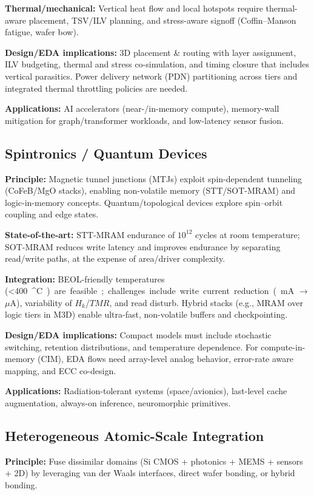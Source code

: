 \documentclass[conference]{IEEEtran}
\begin{document}
\textbf{Thermal/mechanical:}
Vertical heat flow and local hotspots require thermal-aware placement, TSV/ILV planning, and stress-aware signoff (Coffin--Manson fatigue, wafer bow).

\textbf{Design/EDA implications:}
3D placement \& routing with layer assignment, ILV budgeting, thermal and stress co-simulation, and timing closure that includes vertical parasitics.
Power delivery network (PDN) partitioning across tiers and integrated thermal throttling policies are needed.

\textbf{Applications:}
AI accelerators (near-/in-memory compute), memory-wall mitigation for graph/transformer workloads, and low-latency sensor fusion.

\subsection{Spintronics / Quantum Devices}
\textbf{Principle:}
Magnetic tunnel junctions (MTJs) exploit spin-dependent tunneling (CoFeB/MgO stacks), enabling non-volatile memory (STT/SOT-MRAM) and logic-in-memory concepts.
Quantum/topological devices explore spin--orbit coupling and edge states.

\textbf{State-of-the-art:}
STT-MRAM endurance of $10^{12}$ cycles at room temperature; SOT-MRAM reduces write latency and improves endurance by separating read/write paths, at the expense of area/driver complexity.

\textbf{Integration:}
BEOL-friendly temperatures (\SI{<400}{^\circ C}) are feasible; challenges include write current reduction (mA $\rightarrow$ $\mu$A), variability of $H_k$/$TMR$, and read disturb.
Hybrid stacks (e.g., MRAM over logic tiers in M3D) enable ultra-fast, non-volatile buffers and checkpointing.

\textbf{Design/EDA implications:}
Compact models must include stochastic switching, retention distributions, and temperature dependence.
For compute-in-memory (CIM), EDA flows need array-level analog behavior, error-rate aware mapping, and ECC co-design.

\textbf{Applications:}
Radiation-tolerant systems (space/avionics), last-level cache augmentation, always-on inference, neuromorphic primitives.

\subsection{Heterogeneous Atomic-Scale Integration}
\textbf{Principle:}
Fuse dissimilar domains (Si CMOS + photonics + MEMS + sensors + 2D) by leveraging van der Waals interfaces, direct wafer bonding, or hybrid bonding.
\end{document}
